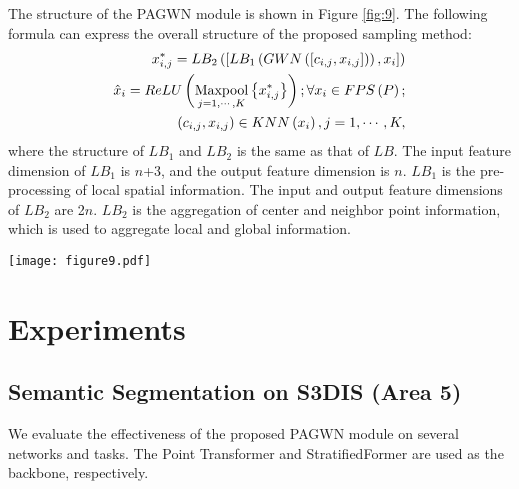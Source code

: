 \documentclass[10pt,twocolumn,letterpaper]{article}
\begin{document}
        The structure of the PAGWN module is shown in Figure \ref{fig:9}.
        The following formula can express the overall structure of the proposed sampling method:
\begin{equation}
            \begin{aligned}
        x_{i,j}^{*} = {L{B_2}\left( {\left[ {L{B_1}\left( {GWN\left( {\left[ {{c_{i,j}},{x_{i,j}}} \right]} \right)} \right),{x_i}} \right]} \right)}\\
        {\hat x_{i}} = ReLU\left( {\mathop {{\rm{Maxpool}}}\limits_{j = 1, \cdots ,K} \left\{ x_{i,j}^{*} \right\}} \right); \forall {x_i} \in FPS\left( P \right); \\
        {\left( {{c_{i,j}},{x_{i,j}}} \right)} \in KNN\left( {{x_i}} \right),j = 1, \cdots ,K,
            \end{aligned}
        \end{equation}
where the structure of ${L{B_1}}$ and ${L{B_2}}$ is the same as that of $LB$.
        The input feature dimension of ${L{B_1}}$ is $n$+3, and the output feature dimension is $n$.
        ${L{B_1}}$ is the pre-processing of local spatial information.
        The input and output feature dimensions of ${L{B_2}}$ are 2$n$.
        ${L{B_2}}$ is the aggregation of center and neighbor point information, which is used to aggregate local and global information.
        \begin{figure*}[!htb]
        \centering
        \texttt{[image: figure9.pdf]}
        \caption{Illustration of our pre-abstraction group-wise window-normalization module. GWN module normalizes the volume of the local region and provides a variety of information. PAGWN module pre-aggregates the features of location encoding and neighborhood points to balance local and global features.}
        \label{fig:9}
        \end{figure*}

\section{Experiments}
    \subsection{Semantic Segmentation on S3DIS (Area 5)}
        We evaluate the effectiveness of the proposed PAGWN module on several networks and tasks. The Point Transformer \cite{24Zhao_2021} and StratifiedFormer \cite{44qq} are used as the backbone, respectively.
\end{document}
